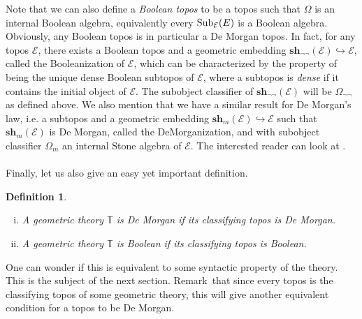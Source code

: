 \documentclass{article}
\newtheorem{definition}[theorem]{Definition}
\newcommand{\T}{\mathbb{T}}
\begin{document}
Note that we can also define a \emph{Boolean topos} to be a topos such that $\Omega$ is an internal Boolean algebra, equivalently every $\textup{Sub}_\mathcal{E}(E)$ is a Boolean algebra. Obviously, any Boolean topos is in particular a De Morgan topos. In fact, for any topos $\mathcal{E}$, there exists a Boolean topos and a geometric embedding $\mathbf{sh}_{\neg\neg}(\mathcal{E})\hookrightarrow{}\mathcal{E}$, called the Booleanization of $\mathcal{E}$, which can be characterized by the property of being the unique dense Boolean subtopos of $\mathcal{E}$, where a subtopos is \emph{dense} if it contains the initial object of $\mathcal{E}$. The subobject classifier of $\mathbf{sh}_{\neg\neg}(\mathcal{E})$ will be $\Omega_{\neg\neg}$ as defined above. We also mention that we have a similar result for De Morgan's law, i.e. a subtopos and a geometric embedding $\mathbf{sh}_m(\mathcal{E})\hookrightarrow{}\mathcal{E}$ such that $\mathbf{sh}_m(\mathcal{E})$ is De Morgan, called the DeMorganization, and with subobject classifier $\Omega_m$ an internal Stone algebra of $\mathcal{E}$. The interested reader can look at \cite{caramello2009morgan}.\\
\\
Finally, let us also give an easy yet important definition.

\begin{definition}
\begin{enumerate}[(i)]
    \item A geometric theory $\T$ is De Morgan if its classifying topos is De Morgan.
    \item A geometric theory $\T$ is Boolean if its classifying topos is Boolean.
\end{enumerate}
     
\end{definition}
One can wonder if this is equivalent to some syntactic property of the theory. This is the subject of the next section. Remark~that since every topos is the classifying topos of some geometric theory, this will give another equivalent condition for a topos to be De Morgan. 
\end{document}
